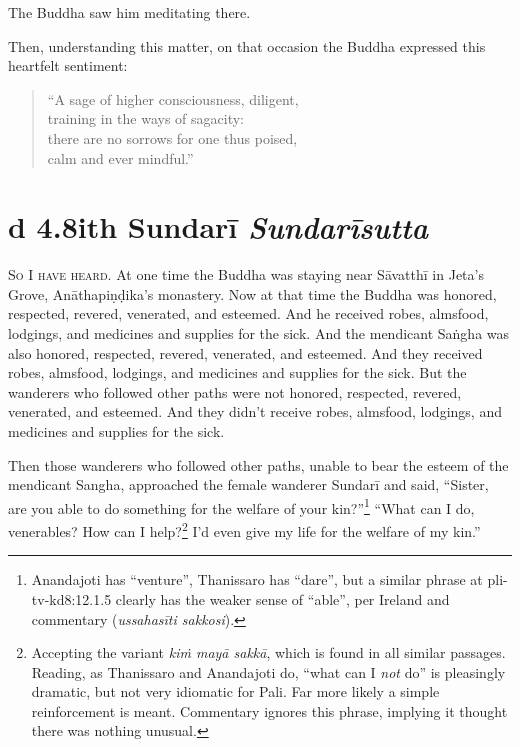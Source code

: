 \documentclass[12pt,openany]{book}%
\newcommand*{\suttatitleacronym}[1]{\smaller[2]{#1}\vspace*{.3em}}
\newcommand*{\suttatitletranslation}[1]{\linebreak{#1}}
\newcommand*{\suttatitleroot}[1]{\linebreak\smaller[2]\itshape{#1}}
\newcommand*{\tocacronym}[1]{\hspace*{-3.3em}{#1}\quad}
\newcommand*{\toctranslation}[1]{#1}
\newcommand*{\tocroot}[1]{(\textit{#1})}
\newcommand*{\scevam}[1]{\textsc{#1}}
\begin{document}
The Buddha saw him meditating there. 

Then, understanding this matter, on that occasion the Buddha expressed this heartfelt sentiment: 

\begin{verse}%
“A sage of higher consciousness, diligent, \\
training in the ways of sagacity: \\
there are no sorrows for one thus poised, \\
calm and ever mindful.” 

%
\end{verse}

%
\section*{{\suttatitleacronym Ud 4.8}{\suttatitletranslation With Sundarī }{\suttatitleroot Sundarīsutta}}
\addcontentsline{toc}{section}{\tocacronym{Ud 4.8} \toctranslation{With Sundarī } \tocroot{Sundarīsutta}}

\scevam{So I have heard. }At one time the Buddha was staying near \textsanskrit{Sāvatthī} in Jeta’s Grove, \textsanskrit{Anāthapiṇḍika}’s monastery. Now at that time the Buddha was honored, respected, revered, venerated, and esteemed. And he received robes, almsfood, lodgings, and medicines and supplies for the sick. And the mendicant \textsanskrit{Saṅgha} was also honored, respected, revered, venerated, and esteemed. And they received robes, almsfood, lodgings, and medicines and supplies for the sick. But the wanderers who followed other paths were not honored, respected, revered, venerated, and esteemed. And they didn’t receive robes, almsfood, lodgings, and medicines and supplies for the sick. 

Then those wanderers who followed other paths, unable to bear the esteem of the mendicant Sangha, approached the female wanderer \textsanskrit{Sundarī} and said, “Sister, are you able to do something for the welfare of your kin?”\footnote{Anandajoti has “venture”, Thanissaro has “dare”, but a similar phrase at pli-tv-kd8:12.1.5 clearly has the weaker sense of “able”, per Ireland and commentary (\textit{\textsanskrit{ussahasīti} sakkosi}). } “What can I do, venerables? How can I help?\footnote{Accepting the variant \textit{\textsanskrit{kiṁ} \textsanskrit{mayā} \textsanskrit{sakkā}}, which is found in all similar passages. Reading, as Thanissaro and Anandajoti do, “what can I \emph{not} do” is pleasingly dramatic, but not very idiomatic for Pali. Far more likely a simple reinforcement is meant. Commentary ignores this phrase, implying it thought there was nothing unusual. } I’d even give my life for the welfare of my kin.” 
\end{document}
